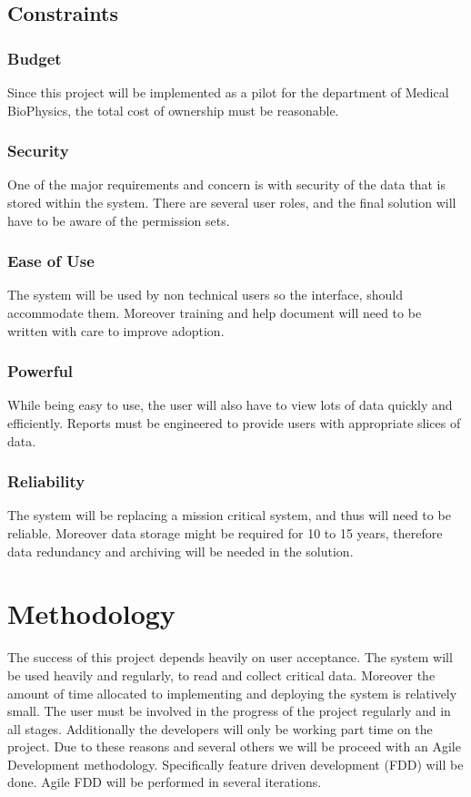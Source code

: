 \documentclass{journal}
\begin{document}
\subsection{ Constraints }
\subsubsection{ Budget }
Since this project will be implemented as a pilot for the department of Medical BioPhysics, the total cost of ownership must be reasonable.
\subsubsection{Security}
One of the major requirements and concern is with security of the data that is stored within the system. There are several user roles, and the final solution will have to be aware of the permission sets. 
\subsubsection{ Ease of Use }
The system will be used by non technical users so the interface, should accommodate them. Moreover training and help document will need to be written with care to improve adoption. 
\subsubsection{ Powerful }
While being easy to use, the user will also have to view lots of data quickly and efficiently. Reports must be engineered to provide users with appropriate slices of data. 
\subsubsection{ Reliability }
The system will be replacing a mission critical system, and thus will need to be reliable. Moreover data storage might be required for 10 to 15 years, therefore data redundancy and archiving will be needed in the solution. 
\section{Methodology}

The success of this project depends heavily on user acceptance. The system will be used heavily and regularly, to read and collect critical data. Moreover the amount of time allocated to implementing and deploying 
the system is relatively small. The user must be involved in the progress of the project regularly and in all stages. Additionally the developers will only be working part time on the project. Due to these reasons and several others we will be proceed with an Agile Development methodology. Specifically
feature driven development (FDD) will be done. Agile FDD will be performed in several iterations. 
\end{document}
